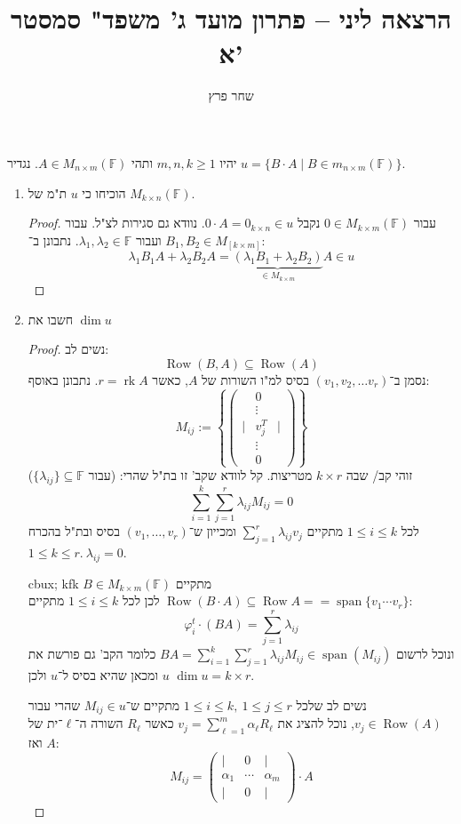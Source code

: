 \documentclass[]{article}
\author{שחר פרץ}
\title{הרצאה ליני – פתרון מועד ג' משפד" סמסטר א'}
\newcommand\ml    {\ell}
\DeclareMathOperator\row   {Row}
\DeclareMathOperator{\Sp}     {span}
\DeclareMathOperator{\rk}     {rk}
\newcommand\F         {\mathbb{F}}
\newcommand\pms[1]    {\begin{pmatrix}
		#1
\end{pmatrix}}
\newcommand\ag        {\alpha}
\renewcommand\lg      {\lambda}
\begin{document}
	\maketitle
	\section{}
	יהיו $m, n, k  \ge 1$ ותהי $A \in M_{n \times m}(\F)$. נגדיר $u = \{B \cdot A \mid B \in m_{n \times m}(\F)\}$. 
	\begin{enumerate}
		\item הוכיחו כי $u$ ת"מ של $M_{k \times n}(\F)$. 
		\begin{proof}
			עבור $0\in M_{k \times m}(\F)$ נקבל $0 \cdot A = 0_{k \times n} \in u$. נוודא גם סגירות לצ"ל. עבור $B_1, B_2 \in M_[k \times m]$ ועבור $\lg_1, \lg_2 \in \F$. נתבונן ב־: 
			\[ \lg_1B_1 A + \lg_2B_2A = \underbrace{(\lg_1B_1 + \lg_2B_2)}_{\in M_{k \times m}}A \in u \]
		\end{proof}
		\item חשבו את $\dim u$
		\begin{proof}
			נשים לב: 
			\[ \row(B, A) \subseteq \row(A) \]
			נסמן ב־$(v_1, v_2, \dots v_{r})$ בסיס למ"ו השורות של $A$, כאשר $r = \rk A$. נתבונן באוסף: 
			\[M_{ij} := \left \{\pms{& 0  &  \\ &\vdots & \\ \vert & v_j^{T} & \vert \\ &\vdots \\ &0} \right \} \]
			זוהי קב/ שבה $k \times r$ מטריצות. קל לוודא שקב' זו בת"ל שהרי: (עבור $\{\lg_{ij}\} \subseteq \F$)
			\[ \sum^{k}_{i = 1}\sum^{r}_{j = 1}\lg_{ij}M_{ij} = 0 \]
			לכל $1 \le i \le k$ מתקיים $\sum_{j = 1}^{r} \lg_{ij}v_j$ ומכייון ש־$(v_1, \dots, v_r)$ בסיס ובת"ל בהכרח $1 \le k \le r. \ \lg_{ij} = 0$. 
			
			cbux; kfk $B \in M_{k \times m}(\F)$ מתקיים $\row(B \cdot A) \subseteq \row A = =\Sp\{v_1 \cdots v_r\}$ לכן לכל $1 \le i \le k$ מתקיים: 
			\[ \varphi_i^t \cdot (BA) = \sum_{j = 1}^r \lg_{ij} \]
			ונוכל לרשום $BA = \sum_{i = 1}^{k}\sum_{j = 1}^{r}\lg_{ij}M_{ij} \in \Sp(M_{ij})$ כלומר הקב' גם פורשת את $u$ ומכאן שהיא בסיס ל־$u$ ולכן $\dim u = k \times r$. 
			
			נשים לב שלכל $1 \le i \le k, \ 1 \le j \le r$ מתקיים ש־$M_{ij} \in u$ שהרי עבור $v_j \in \row(A)$, נוכל להציג את $v_j = \sum_{\ell = 1}^{m} \ag_{\ell}R_{\ml}$ כאשר $R_\ml$ השורה ה־$\ml$־ית של $A$  ואז: 
			\[ M_{ij} = \pms{\vert &0&\vert \\ \ag_1 & \cdots & \ag_m \\ \vert & 0 & \vert} \cdot A \]
		\end{proof}
	\end{enumerate}
\end{document}

